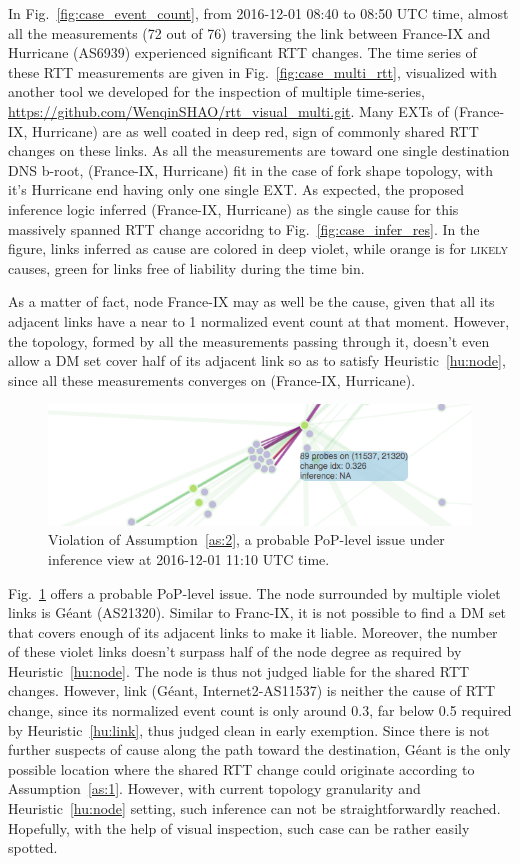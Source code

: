 In Fig.~\ref{fig:case_event_count}, from 2016-12-01 08:40 to 08:50 UTC time, almost all the measurements (72 out of 76) traversing the link between France-IX and Hurricane (AS6939) experienced significant RTT changes.
The time series of these RTT measurements are given in Fig.~\ref{fig:case_multi_rtt}, visualized with another tool we developed for the inspection of multiple time-series, \url{https://github.com/WenqinSHAO/rtt_visual_multi.git}. Many \acp{EXT} of (France-IX, Hurricane) are as well coated in deep red, sign of commonly shared RTT changes on these links. As all the measurements are toward one single destination DNS b-root, 
(France-IX, Hurricane) fit in the case of fork shape topology, with it's Hurricane end having only one single \ac{EXT}. As expected, the proposed inference logic inferred (France-IX, Hurricane) as the single cause for this massively spanned RTT change accoridng to Fig.~\ref{fig:case_infer_res}. In the figure, links inferred as cause are colored in deep violet, while orange is for \textsc{likely} causes, green for links free of liability during the time bin.

As a matter of fact, node France-IX may as well be the cause, given that all its adjacent links have a near to 1 normalized event count at that moment. However, the topology, formed by all the measurements passing through it, doesn't even allow a \ac{DM} set cover half of its adjacent link so as to satisfy Heuristic~\ref{hu:node}, since all these measurements converges on (France-IX, Hurricane).

\begin{figure}[!htb]
\centering
\includegraphics[width=.8\textwidth]{gfx/chap5/case_pop_issue.png}
\caption{Violation of Assumption~\ref{as:2}, a probable PoP-level issue under inference view at 2016-12-01 11:10 UTC time.}
\label{fig:case_pop_issue}
\end{figure}

Fig.~\ref{fig:case_pop_issue} offers a probable PoP-level issue. The node surrounded by multiple violet links is 
Géant (AS21320). 
Similar to Franc-IX, it is not possible to find a \ac{DM} set that covers enough of its adjacent links to make it liable. Moreover, the number of these violet links doesn't surpass half of the node degree as required by Heuristic~\ref{hu:node}. The node is thus not judged liable for the shared RTT changes. 
However, link (Géant, Internet2-AS11537) is neither the cause of RTT change, since its normalized event count is only around 0.3, far below 0.5 required by Heuristic~\ref{hu:link}, thus judged clean in early exemption.
Since there is not further suspects of cause along the path toward the destination, Géant is the only possible location where the shared RTT change could originate according to Assumption~\ref{as:1}. However, with current  topology granularity and Heuristic~\ref{hu:node} setting, such inference can not be straightforwardly reached.
Hopefully, with the help of visual inspection, such case can be rather easily spotted.